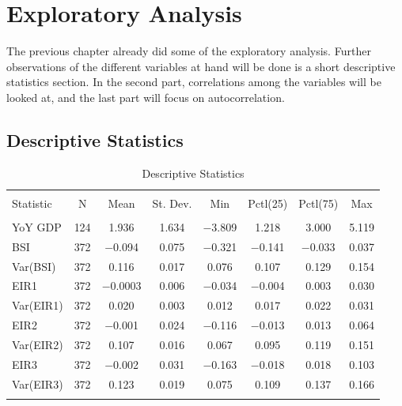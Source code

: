 \documentclass[12pt,a4paper,oneside]{book}
\begin{document}
\chapter{Exploratory Analysis}

The previous chapter already did some of the exploratory analysis.
Further observations of the different variables at hand will be done is a short descriptive statistics section.
In the second part, correlations among the variables will be looked at, and the last part will focus on autocorrelation.


\section{Descriptive Statistics}

\begin{table}[!htbp]  \centering \footnotesize 
  \caption{Descriptive Statistics} 
  \label{tab:descriptive statistics} 
\begin{tabular}{@{\extracolsep{5pt}}lccccccc} 
\\[-1.8ex]\hline 
\hline \\[-1.8ex] 
Statistic & \multicolumn{1}{c}{N} & \multicolumn{1}{c}{Mean} & \multicolumn{1}{c}{St. Dev.} & \multicolumn{1}{c}{Min} & \multicolumn{1}{c}{Pctl(25)} & \multicolumn{1}{c}{Pctl(75)} & \multicolumn{1}{c}{Max} \\ 
\hline \\[-1.8ex] 
YoY GDP     & 124       & 1.936 & 1.634 & $-$3.809 & 1.218 & 3.000 & 5.119 \\ 
BSI         & 372       & $-$0.094 & 0.075 & $-$0.321 & $-$0.141 & $-$0.033 & 0.037 \\ 
Var(BSI)    & 372       & 0.116 & 0.017 & 0.076 & 0.107 & 0.129 & 0.154 \\ 
EIR1        & 372       & $-$0.0003 & 0.006 & $-$0.034 & $-$0.004 & 0.003 & 0.030 \\ 
Var(EIR1)   & 372       & 0.020 & 0.003 & 0.012 & 0.017 & 0.022 & 0.031 \\ 
EIR2        & 372       & $-$0.001  & 0.024 & $-$0.116 & $-$0.013 & 0.013 & 0.064 \\ 
Var(EIR2)   & 372       & 0.107 & 0.016 & 0.067 & 0.095 & 0.119 & 0.151 \\ 
EIR3        & 372  & $-$0.002  & 0.031 & $-$0.163 & $-$0.018 & 0.018 & 0.103 \\ 
Var(EIR3)   & 372       & 0.123 & 0.019 & 0.075 & 0.109 & 0.137 & 0.166 \\ 
\hline \\[-1.8ex] 
\end{tabular} 
\end{table} 
\end{document}
